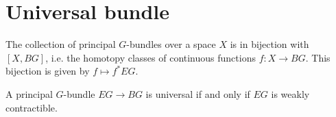 \section{Universal bundle}

	
	\begin{property}
		The collection of principal $G$-bundles over a space $X$ is in bijection with $[X, BG]$, i.e. the homotopy classes of continuous functions $f:X\rightarrow BG$. This bijection is given by $f\mapsto f^*EG$.
	\end{property}
	
	\begin{property}
		A principal $G$-bundle $EG\rightarrow BG$ is universal if and only if $EG$ is weakly contractible.
	\end{property}
